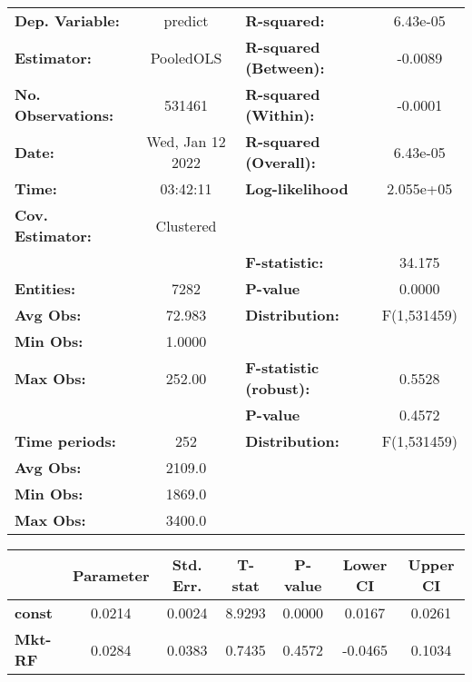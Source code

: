 \begin{center}
\begin{tabular}{lclc}
\toprule
\textbf{Dep. Variable:}    &      predict       & \textbf{  R-squared:         }   &     6.43e-05     \\
\textbf{Estimator:}        &     PooledOLS      & \textbf{  R-squared (Between):}  &     -0.0089      \\
\textbf{No. Observations:} &       531461       & \textbf{  R-squared (Within):}   &     -0.0001      \\
\textbf{Date:}             &  Wed, Jan 12 2022  & \textbf{  R-squared (Overall):}  &     6.43e-05     \\
\textbf{Time:}             &      03:42:11      & \textbf{  Log-likelihood     }   &    2.055e+05     \\
\textbf{Cov. Estimator:}   &     Clustered      & \textbf{                     }   &                  \\
\textbf{}                  &                    & \textbf{  F-statistic:       }   &      34.175      \\
\textbf{Entities:}         &        7282        & \textbf{  P-value            }   &      0.0000      \\
\textbf{Avg Obs:}          &       72.983       & \textbf{  Distribution:      }   &   F(1,531459)    \\
\textbf{Min Obs:}          &       1.0000       & \textbf{                     }   &                  \\
\textbf{Max Obs:}          &       252.00       & \textbf{  F-statistic (robust):} &      0.5528      \\
\textbf{}                  &                    & \textbf{  P-value            }   &      0.4572      \\
\textbf{Time periods:}     &        252         & \textbf{  Distribution:      }   &   F(1,531459)    \\
\textbf{Avg Obs:}          &       2109.0       & \textbf{                     }   &                  \\
\textbf{Min Obs:}          &       1869.0       & \textbf{                     }   &                  \\
\textbf{Max Obs:}          &       3400.0       & \textbf{                     }   &                  \\
\bottomrule
\end{tabular}
\begin{tabular}{lcccccc}
                & \textbf{Parameter} & \textbf{Std. Err.} & \textbf{T-stat} & \textbf{P-value} & \textbf{Lower CI} & \textbf{Upper CI}  \\
\midrule
\textbf{const}  &       0.0214       &       0.0024       &      8.9293     &      0.0000      &       0.0167      &       0.0261       \\
\textbf{Mkt-RF} &       0.0284       &       0.0383       &      0.7435     &      0.4572      &      -0.0465      &       0.1034       \\
\bottomrule
\end{tabular}
\end{center}
